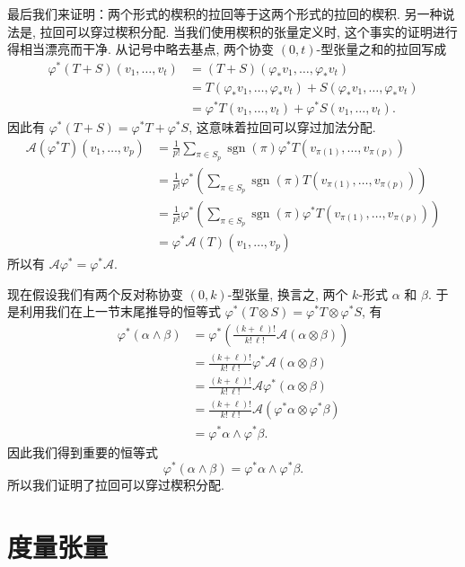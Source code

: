 最后我们来证明：两个形式的楔积的拉回等于这两个形式的拉回的楔积. 另一种说法是, 拉回可以穿过楔积分配. 当我们使用楔积的张量定义时, 这个事实的证明进行得相当漂亮而干净. 从记号中略去基点, 两个协变 $(0,t)$-型张量之和的拉回写成
\begin{align*}
\varphi^*\left(T+S\right)(v_1,\ldots,v_t)&=\left(T+S\right)\left(\varphi_*v_1,\ldots,\varphi_*v_t\right)\\
&=T\left(\varphi_*v_1,\ldots,\varphi_*v_t\right)+S\left(\varphi_*v_1,\ldots,\varphi_*v_t\right)\\
&=\varphi^*T(v_1,\ldots,v_t)+\varphi^*S(v_1,\ldots,v_t).
\end{align*}
因此有 $\varphi^*(T+S)=\varphi^*T+\varphi^*S$, 这意味着拉回可以穿过加法分配.
\begin{align*}
\mathcal{A}\left(\varphi^*T\right)(v_1,\ldots,v_p)
&=\frac{1}{p!}\sum_{\pi\in S_p}\operatorname{sgn}(\pi)\varphi^*T\left(v_{\pi(1)},\ldots,v_{\pi(p)}\right)\\
&=\frac{1}{p!}\varphi^*\left(\sum_{\pi\in S_p}\operatorname{sgn}(\pi)T\left(v_{\pi(1)},\ldots,v_{\pi(p)}\right)\right)\\
&=\frac{1}{p!}\varphi^*\left(\sum_{\pi\in S_p}\operatorname{sgn}(\pi)\varphi^*T\left(v_{\pi(1)},\ldots,v_{\pi(p)}\right)\right)\\
&=\varphi^*\mathcal{A}(T)(v_1,\ldots,v_p)
\end{align*}
所以有 $\mathcal{A}\varphi^*=\varphi^*\mathcal{A}$.

现在假设我们有两个反对称协变 $(0,k)$-型张量, 换言之, 两个 $k$-形式 $\alpha$ 和 $\beta$. 于是利用我们在上一节末尾推导的恒等式 $\varphi^*(T\otimes S)=\varphi^*T\otimes\varphi^*S$, 有
\begin{align*}
\varphi^*(\alpha\wedge\beta)&=\varphi^*\left(\frac{(k+\ell)!}{k!\,\ell!}\mathcal{A}(\alpha\otimes\beta)\right)\\
&=\frac{(k+\ell)!}{k!\,\ell!}\varphi^*\mathcal{A}(\alpha\otimes\beta)\\
&=\frac{(k+\ell)!}{k!\,\ell!}\mathcal{A}\varphi^*(\alpha\otimes\beta)\\
&=\frac{(k+\ell)!}{k!\,\ell!}\mathcal{A}\left(\varphi^*\alpha\otimes\varphi^*\beta\right)\\
&=\varphi^*\alpha\wedge\varphi^*\beta.
\end{align*}
因此我们得到重要的恒等式
\[
\varphi^*(\alpha\wedge\beta)=\varphi^*\alpha\wedge\varphi^*\beta.
\]
所以我们证明了拉回可以穿过楔积分配.

\section{度量张量}

